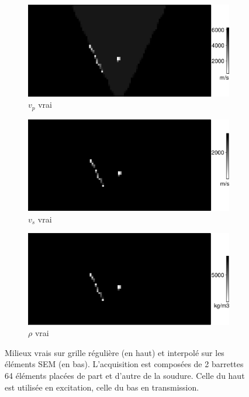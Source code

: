 \documentclass[a4paper,11pt]{report} %
\newenvironment{changemargin}[2]{\begin{list}{}{%
\setlength{\topsep}{0pt}%
\setlength{\leftmargin}{0pt}%
\setlength{\rightmargin}{0pt}%
\setlength{\listparindent}{\parindent}%
\setlength{\itemindent}{\parindent}%
\setlength{\parsep}{0pt plus 1pt}%
\addtolength{\leftmargin}{#1}%
\addtolength{\rightmargin}{#2}%
\setlength{\textwidth}{21cm}
}\item }{\end{list}}
\begin{document}
\begin{figure}[!h]
\begin{changemargin}{-2cm}{-2cm}
		\begin{subfigure}[b]{0.3\textwidth}
			\includegraphics[width=\textwidth]{img/vpfile.png}
			\caption{$v_{p}$ vrai}
		\end{subfigure}
		\begin{subfigure}[b]{0.3\textwidth}
			\includegraphics[width=\textwidth]{img/vsfile.png}
			\caption{$v_{s}$ vrai}
		\end{subfigure}
		\begin{subfigure}[b]{0.3\textwidth}
			\includegraphics[width=\textwidth]{img/rhofile.png}
			\caption{$\rho$ vrai}
		\end{subfigure}
	\end{changemargin}
	\caption{\label{milieux_vrais}Milieux vrais sur grille régulière (en haut) et interpolé sur les éléments SEM (en bas). L'acquisition est composées de 2 barrettes 64 éléments placées de part et d'autre de la soudure. Celle du haut est utilisée en excitation, celle du bas en transmission.}
\end{figure}
\end{document}
